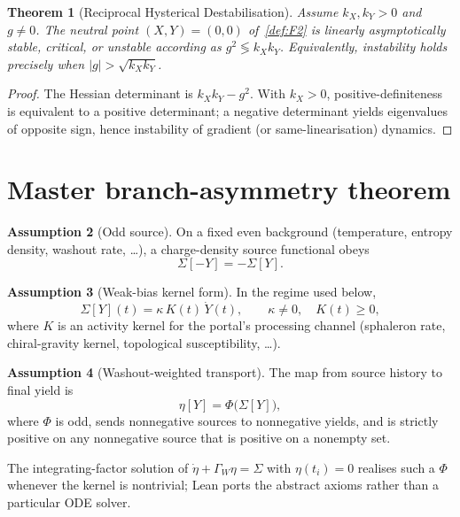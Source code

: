 \documentclass[11pt]{article}
\newtheorem{theorem}{Theorem}[section]
\theoremstyle{definition}
\newtheorem{assumption}[theorem]{Assumption}
\theoremstyle{remark}
\begin{document}
\begin{theorem}[Reciprocal Hysterical Destabilisation]
\label{thm:reciprocal-destab}
Assume $k_X,k_Y>0$ and $g\neq0$.
The neutral point $(X,Y)=(0,0)$ of~\ref{def:F2} is linearly asymptotically
stable, critical, or unstable according as $g^2\lessgtr k_Xk_Y$.
Equivalently, instability holds precisely when $|g|>\sqrt{k_Xk_Y}$.
\end{theorem}
\begin{proof}
The Hessian determinant is $k_Xk_Y-g^2$.
With $k_X>0$, positive-definiteness is equivalent to a positive determinant;
a negative determinant yields eigenvalues of opposite sign, hence instability of
gradient (or same-linearisation) dynamics.
\end{proof}

\section{Master branch-asymmetry theorem}
\label{sec:master}
\begin{assumption}[Odd source]
\label{ass:odd-source}
On a fixed even background (temperature, entropy density, washout rate, \ldots),
a charge-density source functional obeys
\begin{equation}
\Sigma[-Y]=-\Sigma[Y].
\end{equation}
\end{assumption}

\begin{assumption}[Weak-bias kernel form]
\label{ass:kernel}
In the regime used below,
\begin{equation}
\label{eq:Sigma}
\Sigma[Y](t)=\kappa\,K(t)\,\dot Y(t),
\qquad \kappa\neq0,\quad K(t)\ge0,
\end{equation}
where $K$ is an activity kernel for the portal's processing channel
(sphaleron rate, chiral-gravity kernel, topological susceptibility, \ldots).
\end{assumption}

\begin{assumption}[Washout-weighted transport]
\label{ass:Phi}
The map from source history to final yield is
\begin{equation}
\eta[Y]=\Phi\bigl(\Sigma[Y]\bigr),
\end{equation}
where $\Phi$ is odd, sends nonnegative sources to nonnegative yields, and is
strictly positive on any nonnegative source that is positive on a nonempty set.
\end{assumption}
The integrating-factor solution of
$\dot\eta+\Gamma_W\eta=\Sigma$ with $\eta(t_i)=0$ realises such a $\Phi$ whenever
the kernel is nontrivial; Lean ports the abstract axioms rather than a
particular ODE solver.
\end{document}
